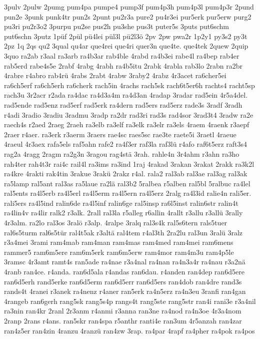 {3pulv
2pulw
2pumg
pum4pa
pumpe4
pump3f
pum4p3h
pum4p3l
pum4p3r
2pund
pun2e
3punk
punk4tr
pun2s
2punt
pu2r3a
pure2
pu4r3ei
pur5erk
pur5erw
purg2
pu3ri
pu2r3o2
3purpu
pu2se
pus2h
pu3she
pus3t
puter5s
3puts
put6schm
put6schn
3putz
1püf
2pül
pü4lei
pül3l
pü2l3ö
2pv
2pw
pwa2r
1p2y1
py3s2
py3t
2pz
1q
2qs
qu2
3qual
qu4ar
que4rei
que4ri
quer3n
que4te.
que4tek
2quew
2quip
3quo
ra2ab
r3aal
ra3arb
ra4b3ar
rab4ble
4rabd
ra4b3ei
rabe4l
ra4bep
rab4er
rab5erd
rabe4s5e
2rabf
4rabg
4rabh
ra4b5itu
2rabk
4rabla
rab3lo
2rabn
ra2br
4rabre
r4abro
rab4rü
4rabs
2rabt
4rabw
3raby2
4rabz
4r3acet
ra6cher5ei
ra6ch5erf
ra6ch5erh
ra6cherk
rach5in
4rachs
rach5sk
rach6t5er6h
rachts4
racht5sp
rach3u
3r2acr
r2ada
ra4dac
ra4d3a4m
ra4d3an
4radap
3radar
rad5ein
4r5a4del.
rad5ende
rad5enz
rad5erf
rad5erk
ra4dern
rad5ers
rad5erz
rade3s
3radf
3radh
r4adi
3radio
3radiu
3radmu
3radp
ra2dr
rad3ri
rad3s
rad4sor
3rad3t4
3radw
ra2e
raech4s
r2aed
2raeg
2raeh
ra3elb
ra3elf
ra3elk
ra3elr
ra3els
4raem
4raenk
r3aepf
2raer
r4aer.
ra3erk
r3aerm
3raers
rae4sc
raes5sc
rae3te
raete5i
3raetl
4raeue
4raeul
4r3aex
rafa5els
raf5ahn
rafe2
ra4f3er
raf3la
raf3lü
r4afo
raf6t5erz
raft3s4
rag2a
4ragg
2ragm
ra2g3n
3ragou
rag4stä
3rah.
rahle4n
3r4ahm
r3ahn
ra3ho
rah4ter
rah4t3r
rai4c
rail4l
ra3ims
ra3ind
1raj
4rakad
3rakan
3rakat
2rakk
ra3k2l
ra4kre
4rakti
rak4tin
3rakue
3rakü
2rakz
r4al.
rala2
ral3ab
ral3ae
ral3ag
ral3ak
ra5lamp
ral5ant
ral3as
ra5laue
ra2lä
ral3b2
5ralbea
r5alben
ral5bl
5ralbuc
ra4lel
ral5ents
ra4l5erb
ra4l5erl
ra4l5erm
ra4l5ern
ra4l5erz
2ralg
ra4l3id
ralie4n
rali5er.
rali5ers
ra4l5ind
ralin6de
ra4l5inf
ralin6ge
ral5insp
ra6l5inst
ralin6str
ralin4t
ra4lin4v
ra4lir
ralk2
r3alk.
2rall
ral3la
r5alleg
r6allin
4rallt
r3allu
r3allü
3rally
4r3alm.
ra2lo
ral3os
3ralö
r3alp.
4ralpe
3ralq
ral3s4k
ral5s6tern
rals5tuer
ral6s5turm
ral6s5tür
ral4t5ak
r3altä
ral4tem
r4al3th
2ra2lu
ral3un
3ralü
3ralz
r3a4mei
3rami
ram4mab
ram4man
ram4mas
ram4med
ram4mei
ram6mens
rammer5
ram6m5ere
ram6m5erk
ram6m5erw
ram4mor
ram4m3u
ram4p5le
3ramsc
4r3amt
ramt4s
ran5ade
ra4nae
r3a4nal
ra4nan
ra4n3a4r
ra4nau
r3a2nä
4ranb
ran4ce.
r4anda.
ran6d5ala
r4andas
ran6dau.
r4anden
ran4dep
ran6d5ere
ran6d5erh
rand5erke
ran6d5erm
ran6d5err
ran6d5ers
ran4dob
ran4dre
rand3s
rands4t
4ranei
r3anek
ra4nenz
r4aner
ran5erk
ra4n5erz
ra4n3eu
3ranfi
ran4gan
4rangeb
ran6gerh
rang5sk
rang5s4p
rangs4t
rang5ste
rang5str
ran4i
rani3e
r3a4nil
ra3nin
ran4kr
2ranl
2r3anm
r4anmi
r3anna
ran3ne
ra4nod
ra4n3oe
4r3a4nom
2ranp
2rans
r4ans.
ran5skr
ran4spa
r5anthr
ranti4e
ran3um
4r5anzah
ran4zar
ran4z5er
ran4zin
4ranzu
4ranzü
ran4zw
3rap.
ra4par
4rapf
ra4pher
ra4pok
ra4pos
}
